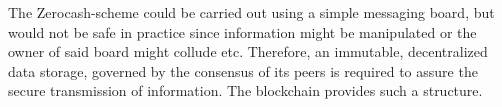 The Zerocash-scheme could be carried out using a simple messaging board, but would not be safe in practice since information might be manipulated or the owner of said board might collude etc. Therefore, an immutable, decentralized data storage, governed by the consensus of its peers is required to assure the secure transmission of information. The blockchain provides such a structure. 

